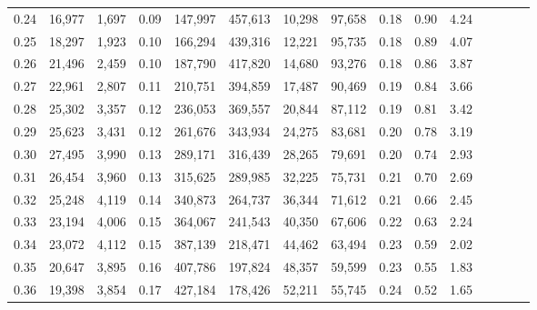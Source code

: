 \begin{tabular}{rrrcrrrrrrrrrrr}
0.24 &  16,977 &  1,697 &                                       0.09 &  147,997 &  457,613 &   10,298 &   97,658 &  0.18 &  0.90 &                         4.24 \\
0.25 &  18,297 &  1,923 &                                       0.10 &  166,294 &  439,316 &   12,221 &   95,735 &  0.18 &  0.89 &                         4.07 \\
0.26 &  21,496 &  2,459 &                                       0.10 &  187,790 &  417,820 &   14,680 &   93,276 &  0.18 &  0.86 &                         3.87 \\
0.27 &  22,961 &  2,807 &                                       0.11 &  210,751 &  394,859 &   17,487 &   90,469 &  0.19 &  0.84 &                         3.66 \\
0.28 &  25,302 &  3,357 &                                       0.12 &  236,053 &  369,557 &   20,844 &   87,112 &  0.19 &  0.81 &                         3.42 \\
0.29 &  25,623 &  3,431 &                                       0.12 &  261,676 &  343,934 &   24,275 &   83,681 &  0.20 &  0.78 &                         3.19 \\
0.30 &  27,495 &  3,990 &                                       0.13 &  289,171 &  316,439 &   28,265 &   79,691 &  0.20 &  0.74 &                         2.93 \\
0.31 &  26,454 &  3,960 &                                       0.13 &  315,625 &  289,985 &   32,225 &   75,731 &  0.21 &  0.70 &                         2.69 \\
0.32 &  25,248 &  4,119 &                                       0.14 &  340,873 &  264,737 &   36,344 &   71,612 &  0.21 &  0.66 &                         2.45 \\
0.33 &  23,194 &  4,006 &                                       0.15 &  364,067 &  241,543 &   40,350 &   67,606 &  0.22 &  0.63 &                         2.24 \\
0.34 &  23,072 &  4,112 &                                       0.15 &  387,139 &  218,471 &   44,462 &   63,494 &  0.23 &  0.59 &                         2.02 \\
0.35 &  20,647 &  3,895 &                                       0.16 &  407,786 &  197,824 &   48,357 &   59,599 &  0.23 &  0.55 &                         1.83 \\
0.36 &  19,398 &  3,854 &                                       0.17 &  427,184 &  178,426 &   52,211 &   55,745 &  0.24 &  0.52 &                         1.65 \\

\end{tabular}
